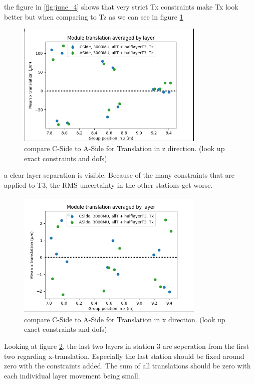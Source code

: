 the figure in \ref{fig:june_4} shows that very strict Tx constraints make Tx look better but when comparing to Tz as we can see in figure \ref{fig:june_5}
\begin{figure}
  \centering
  \includegraphics[width=0.8\textwidth]{plots/june_21/CA_allT_halfT3_Tz.png}
  \caption{compare C-Side to A-Side for Translation in z direction. (look up exact constraints and dofs)}
  \label{fig:june_5}
\end{figure}
a clear layer separation is visible. Because of the many constraints that are
applied to T3, the RMS uncertainty in the other stations get worse.

\begin{figure}
  \centering
  \includegraphics[width=0.8\textwidth]{plots/june_21/CA_allT_halfT3_Tx.png}
  \caption{compare C-Side to A-Side for Translation in x direction. (look up exact constraints and dofs)}
  \label{fig:june_6}
\end{figure}

Looking at figure \ref{fig:june_6}, the last two layers in station 3 are
seperation from the first two regarding x-translation. Especially the last
station should be fixed around zero with the constraints added. The sum of
all translations should be zero with each individual layer movement being small.

